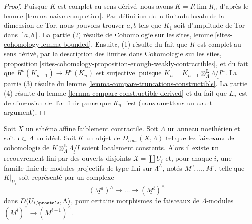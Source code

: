 \begin{proof}
Puisque $K$ est complet au sens dérivé, nous avons $K = R\lim K_n$ d'après le
lemme \ref{lemma-naive-completion}.
Par définition de la finitude locale de la dimension de Tor, nous pouvons trouver
$a, b$ tels que $K_1$ soit d'amplitude de Tor dans $[a, b]$.
La partie (2) résulte de
Cohomologie sur les sites, lemme \ref{sites-cohomology-lemma-bounded}.
Ensuite, (1) résulte du fait que $K$ est complet au sens dérivé, par la description
des limites dans
Cohomologie sur les sites, proposition
\ref{sites-cohomology-proposition-enough-weakly-contractibles},
et du fait que $H^b(K_{n + 1}) \to H^b(K_n)$ est surjective,
puisque $K_n = K_{n + 1} \otimes^\mathbf{L}_\Lambda \underline{\Lambda/I^n}$.
La partie (3) résulte du
lemme \ref{lemma-compare-truncations-constructible}.
La partie (4) résulte du
lemme \ref{lemma-compare-constructible-derived}
et du fait que $L_n$ est de dimension de Tor finie parce que $K_n$ l'est
(nous omettons un court argument).
\end{proof}

\begin{lemma}
\label{lemma-local-structure-constructible-complex}
Soit $X$ un schéma affine faiblement contractile. Soit $\Lambda$ un
anneau noethérien et soit $I \subset \Lambda$ un idéal. Soit $K$ un objet de
$D_{cons}(X, \Lambda)$ tel que les faisceaux de cohomologie de
$K \otimes_\Lambda^\mathbf{L} \underline{\Lambda/I}$ soient localement
constants. Alors il existe un recouvrement fini par des ouverts disjoints
$X = \coprod U_i$ et, pour chaque $i$, une famille finie de
modules projectifs de type fini sur $\Lambda^\wedge$, notés $M^a, \ldots, M^b$,
telle que $K|_{U_i}$ soit représenté par un complexe
$$
(\underline{M^a})^\wedge \to \ldots \to (\underline{M^b})^\wedge
$$
dans $D(U_{i, \proetale}, \Lambda)$, pour certains morphismes de faisceaux de
$\Lambda$-modules $(\underline{M^i})^\wedge \to (\underline{M^{i + 1}})^\wedge$.
\end{lemma}

